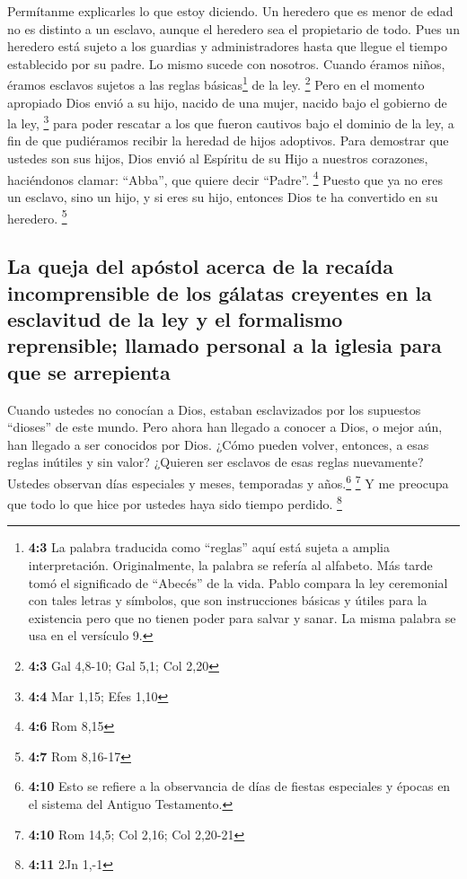  Permítanme explicarles lo que estoy diciendo. Un heredero
que es menor de edad no es distinto a un esclavo, aunque el heredero sea
el propietario de todo.  Pues un heredero está sujeto a
los guardias y administradores hasta que llegue el tiempo establecido
por su padre.  Lo mismo sucede con nosotros. Cuando éramos
niños, éramos esclavos sujetos a las reglas básicas\footnote{\textbf{4:3}
  La palabra traducida como ``reglas'' aquí está sujeta a amplia
  interpretación. Originalmente, la palabra se refería al alfabeto. Más
  tarde tomó el significado de ``Abecés'' de la vida. Pablo compara la
  ley ceremonial con tales letras y símbolos, que son instrucciones
  básicas y útiles para la existencia pero que no tienen poder para
  salvar y sanar. La misma palabra se usa en el versículo 9.} de la ley.
\footnote{\textbf{4:3} Gal 4,8-10; Gal 5,1; Col 2,20} 
Pero en el momento apropiado Dios envió a su hijo, nacido de una mujer,
nacido bajo el gobierno de la ley, \footnote{\textbf{4:4} Mar 1,15; Efes
  1,10}  para poder rescatar a los que fueron cautivos
bajo el dominio de la ley, a fin de que pudiéramos recibir la heredad de
hijos adoptivos.  Para demostrar que ustedes son sus
hijos, Dios envió al Espíritu de su Hijo a nuestros corazones,
haciéndonos clamar: ``Abba'', que quiere decir ``Padre''. \footnote{\textbf{4:6}
  Rom 8,15}  Puesto que ya no eres un esclavo, sino un
hijo, y si eres su hijo, entonces Dios te ha convertido en su heredero.
\footnote{\textbf{4:7} Rom 8,16-17}

\hypertarget{la-queja-del-apuxf3stol-acerca-de-la-recauxedda-incomprensible-de-los-guxe1latas-creyentes-en-la-esclavitud-de-la-ley-y-el-formalismo-reprensible-llamado-personal-a-la-iglesia-para-que-se-arrepienta}{%
\subsection{La queja del apóstol acerca de la recaída incomprensible de
los gálatas creyentes en la esclavitud de la ley y el formalismo
reprensible; llamado personal a la iglesia para que se
arrepienta}\label{la-queja-del-apuxf3stol-acerca-de-la-recauxedda-incomprensible-de-los-guxe1latas-creyentes-en-la-esclavitud-de-la-ley-y-el-formalismo-reprensible-llamado-personal-a-la-iglesia-para-que-se-arrepienta}}

 Cuando ustedes no conocían a Dios, estaban esclavizados
por los supuestos ``dioses'' de este mundo.  Pero ahora
han llegado a conocer a Dios, o mejor aún, han llegado a ser conocidos
por Dios. ¿Cómo pueden volver, entonces, a esas reglas inútiles y sin
valor? ¿Quieren ser esclavos de esas reglas nuevamente? 
Ustedes observan días especiales y meses, temporadas y años.\footnote{\textbf{4:10}
  Esto se refiere a la observancia de días de fiestas especiales y
  épocas en el sistema del Antiguo Testamento.} \footnote{\textbf{4:10}
  Rom 14,5; Col 2,16; Col 2,20-21}  Y me preocupa que
todo lo que hice por ustedes haya sido tiempo perdido. \footnote{\textbf{4:11}
  2Jn 1,-1}

